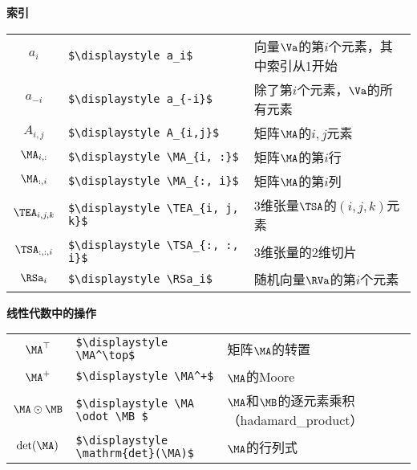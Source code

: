 \vspace{\notationgap}
\begin{minipage}{\textwidth}
\centerline{\bf 索引}
\bgroup
\def\arraystretch{1.5}
\begin{tabular}{clp{3.25in}}
   $\displaystyle a_i$ 			      &  \lstinline!$\displaystyle a_i$ 				!						& 向量$\Va$的第$i$个元素，其中索引从1开始  \\
   $\displaystyle a_{-i}$ 		      &  \lstinline!$\displaystyle a_{-i}$ 			!							& 除了第$i$个元素，$\Va$的所有元素 \\
   $\displaystyle A_{i,j}$ 		      &  \lstinline!$\displaystyle A_{i,j}$ 			!							& 矩阵$\MA$的$i,j$元素 \\
   $\displaystyle \MA_{i, :}$ 	      &  \lstinline!$\displaystyle \MA_{i, :}$ 		!								& 矩阵$\MA$的第$i$行 \\
   $\displaystyle \MA_{:, i}$ 	      &  \lstinline!$\displaystyle \MA_{:, i}$ 		!								& 矩阵$\MA$的第$i$列 \\
   $\displaystyle \TEA_{i, j, k}$     &    \lstinline!$\displaystyle \TEA_{i, j, k}$ 	!									& 3维张量$\TSA$的$(i, j, k)$元素   \\
   $\displaystyle \TSA_{:, :, i}$     &    \lstinline!$\displaystyle \TSA_{:, :, i}$ 	!									& 3维张量的2维切片 \\
   $\displaystyle \RSa_i$ 		      &  \lstinline!$\displaystyle \RSa_i$ 			!							& 随机向量$\RVa$的第$i$个元素 \\
\end{tabular} 
\egroup
\end{minipage}

\vspace{\notationgap}
\begin{minipage}{\textwidth}
\centerline{\bf 线性代数中的操作}
\bgroup
\def\arraystretch{1.5}
\begin{tabular}{clp{3.25in}}
$\displaystyle \MA^\top$ 				&\lstinline!$\displaystyle \MA^\top$ 			!					& 矩阵$\MA$的转置 \\
$\displaystyle \MA^+$ 					&\lstinline!$\displaystyle \MA^+$ 				!				& $\MA$的\gls{Moore} \\
$\displaystyle \MA \odot \MB $ 			&\lstinline!$\displaystyle \MA \odot \MB $ 		!						&  $\MA$和$\MB$的逐元素乘积（\gls{hadamard_product}） \\
$\displaystyle \mathrm{det}(\MA)$ 		&\lstinline!$\displaystyle \mathrm{det}(\MA)$ 	!							& $\MA$的行列式 \\

\end{tabular} 
\egroup
\end{minipage}

